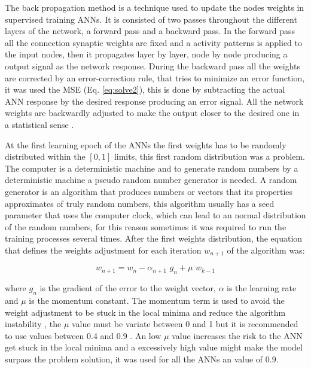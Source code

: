 The back propagation method is a technique used to update the nodes weights in supervised training ANNs. It is consisted of two passes throughout the different layers of the network, a forward pass and a backward pass. In the forward pass all the connection synaptic weights are fixed and a activity patterns is applied to the input nodes, then it propagates layer by layer, node by node producing a output signal as the network response. During the backward pass all the weights are corrected by an error-correction rule, that tries to minimize an error function, it was used the MSE (Eq. \ref{eq:solve2}), this is done by subtracting the actual ANN response by the desired response producing an error signal. All the network weights are backwardly adjusted to make the output closer to the desired one in a statistical sense \cite{dao2002performance}.

At the first learning epoch of the ANNs the first weights has to be randomly distributed within the $[0, 1]$ limits, this first random distribution was a problem. The computer is a deterministic machine and to generate random numbers by a deterministic machine a pseudo random number generator is needed. A random generator is an algorithm that produces numbers or vectors that its properties approximates of truly random numbers, this algorithm usually has a seed parameter that uses the computer clock, which can lead to an normal distribution of the random numbers, for this reason sometimes it was required to run the training processes several times. After the first weights distribution, the equation that defines the weights adjustment for each iteration $w_{n + 1}$ of the algorithm was:

\begin{equation}
 \label{eq:solve16}
w_{n+1} = w_n - \alpha_{n + 1} \,\, g_n + \mu \,\, w_{k - 1}
\end{equation}

where $g_n$ is the gradient of the error to the weight vector, $\alpha$ is the learning rate and $\mu$ is the momentum constant. The momentum term is used to avoid the weight adjustment to be
stuck in the local minima and reduce the algorithm instability \cite{haykin2004comprehensive}, the $\mu$ value must be variate between 0 and 1 but it is recommended to use values between 0.4 and 0.9 \cite{wythoff1993backpropagation}.
An low $\mu$ value increases the risk to the ANN get stuck in the local minima and a excessively high value might make the model surpass the problem solution, it was used for all the ANNs an value of 0.9.

